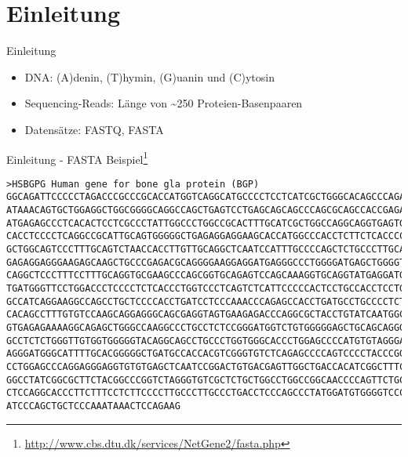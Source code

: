 \section{Einleitung}

\begin{frame}{Einleitung}
    \begin{itemize}
        \item DNA: (A)denin, (T)hymin, (G)uanin und (C)ytosin
        \item Sequencing-Reads: Länge von \textasciitilde 250 Proteien-Basenpaaren
        \item Datensätze: FASTQ, FASTA
    \end{itemize}
\end{frame}


\begin{frame}[fragile]{Einleitung - FASTA Beispiel\footnote{\url{http://www.cbs.dtu.dk/services/NetGene2/fasta.php}}}
    \begin{verbatim}
>HSBGPG Human gene for bone gla protein (BGP)
GGCAGATTCCCCCTAGACCCGCCCGCACCATGGTCAGGCATGCCCCTCCTCATCGCTGGGCACAGCCCAGAGGGT
ATAAACAGTGCTGGAGGCTGGCGGGGCAGGCCAGCTGAGTCCTGAGCAGCAGCCCAGCGCAGCCACCGAGACACC
ATGAGAGCCCTCACACTCCTCGCCCTATTGGCCCTGGCCGCACTTTGCATCGCTGGCCAGGCAGGTGAGTGCCCC
CACCTCCCCTCAGGCCGCATTGCAGTGGGGGCTGAGAGGAGGAAGCACCATGGCCCACCTCTTCTCACCCCTTTG
GCTGGCAGTCCCTTTGCAGTCTAACCACCTTGTTGCAGGCTCAATCCATTTGCCCCAGCTCTGCCCTTGCAGAGG
GAGAGGAGGGAAGAGCAAGCTGCCCGAGACGCAGGGGAAGGAGGATGAGGGCCCTGGGGATGAGCTGGGGTGAAC
CAGGCTCCCTTTCCTTTGCAGGTGCGAAGCCCAGCGGTGCAGAGTCCAGCAAAGGTGCAGGTATGAGGATGGACC
TGATGGGTTCCTGGACCCTCCCCTCTCACCCTGGTCCCTCAGTCTCATTCCCCCACTCCTGCCACCTCCTGTCTG
GCCATCAGGAAGGCCAGCCTGCTCCCCACCTGATCCTCCCAAACCCAGAGCCACCTGATGCCTGCCCCTCTGCTC
CACAGCCTTTGTGTCCAAGCAGGAGGGCAGCGAGGTAGTGAAGAGACCCAGGCGCTACCTGTATCAATGGCTGGG
GTGAGAGAAAAGGCAGAGCTGGGCCAAGGCCCTGCCTCTCCGGGATGGTCTGTGGGGGAGCTGCAGCAGGGAGTG
GCCTCTCTGGGTTGTGGTGGGGGTACAGGCAGCCTGCCCTGGTGGGCACCCTGGAGCCCCATGTGTAGGGAGAGG
AGGGATGGGCATTTTGCACGGGGGCTGATGCCACCACGTCGGGTGTCTCAGAGCCCCAGTCCCCTACCCGGATCC
CCTGGAGCCCAGGAGGGAGGTGTGTGAGCTCAATCCGGACTGTGACGAGTTGGCTGACCACATCGGCTTTCAGGA
GGCCTATCGGCGCTTCTACGGCCCGGTCTAGGGTGTCGCTCTGCTGGCCTGGCCGGCAACCCCAGTTCTGCTCCT
CTCCAGGCACCCTTCTTTCCTCTTCCCCTTGCCCTTGCCCTGACCTCCCAGCCCTATGGATGTGGGGTCCCCATC
ATCCCAGCTGCTCCCAAATAAACTCCAGAAG
    \end{verbatim}
\end{frame}

